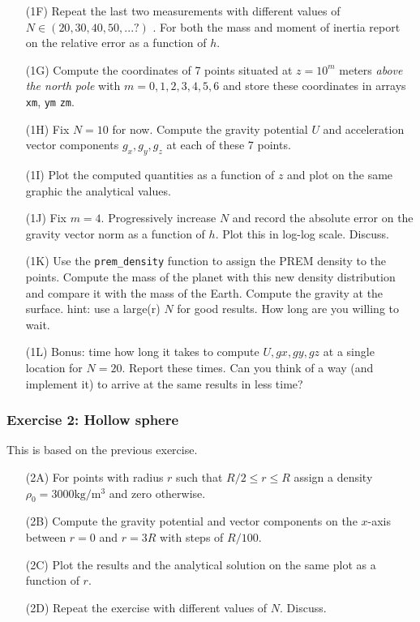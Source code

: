 \begin{itemize}
\item[(1F)] Repeat the last two measurements with different values of $N\in(20,30,40,50,...?)$ .
For both the mass and moment of inertia report on the relative error as a function of $h$.

\item[(1G)] Compute the coordinates of 7 points situated at $z=10^m$ meters {\it above the north pole} with $m=0,1,2,3,4,5,6$ and 
store these coordinates in arrays {\tt xm}, {\tt ym} {\tt zm}. 

\item[(1H)] Fix $N=10$ for now. Compute the gravity potential $U$ and acceleration vector components $g_x,g_y,g_z$ at each of these 7 points. 
 
\item[(1I)] Plot the computed quantities as a function of $z$ and plot on the same graphic the analytical values. 

\item[(1J)] Fix $m=4$. Progressively increase $N$ and record the absolute error on the gravity vector norm 
as a function of $h$. Plot this in log-log scale. Discuss.

\item[(1K)] Use the {\tt prem\_density} function to assign the PREM \cite{dzan81} density to the points. 
Compute the mass of the planet with this 
new density distribution and compare it with the mass of the Earth. Compute the gravity at the surface.
hint: use a large(r) $N$ for good results. How long are you willing to wait. 

\item[(1L)] Bonus: time how long it takes to compute $U,gx,gy,gz$ at a single location for $N=20$. Report these times. 
Can you think of a way (and implement it) to arrive at the same results in less time?  

\end{itemize}

\subsubsection*{Exercise 2: Hollow sphere}

This is based on the previous exercise. 
\begin{itemize}
\item[(2A)] For points with radius $r$ such that $R/2 \le r \le R$ assign a density $\rho_0=3000\si{\kilo\gram\per\cubic\metre}$ 
and zero otherwise.
\item[(2B)] Compute the gravity potential and vector components on the $x$-axis between $r=0$ and $r=3R$ 
with steps of $R/100$.
\item[(2C)] Plot the results and the analytical solution on the same plot as a function of $r$.
\item[(2D)] Repeat the exercise with different values of $N$. Discuss.
\end{itemize}

